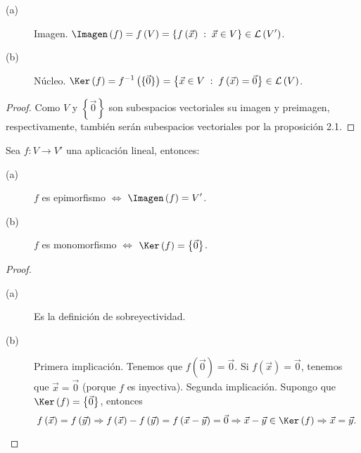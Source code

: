 \begin{fcolorary}[]
\normalfont 
\begin{description}
	\item[(a)] Imagen. $\displaystyle \Imagen\left(f\right) = f\left(V\right) = \left\{ f\left(\vec{x}\right)\; :\; \vec{x} \in V\right\}\in \mathcal{L}\left(V'\right)  $.
		\item[(b)] Núcleo. $\displaystyle \Ker\left(f\right) = f^{-1}\left(\{\vec{0}\}\right) = \left\{ \vec{x}\in V\; : \; f\left(\vec{x}\right) = \vec{0}\right\} \in \mathcal{L}\left(V\right) $.
\end{description}
\end{fcolorary}
\begin{proof}
	Como $\displaystyle V $ y $\displaystyle \left\{ \vec{0}\right\}  $ son subespacios vectoriales su imagen y preimagen, respectivamente, también serán subespacios vectoriales por la proposición 2.1. 
\end{proof}


\begin{fprop}[]
\normalfont Sea $\displaystyle f: V \to V' $ una aplicación lineal, entonces:
\begin{description}
\item[(a)] $\displaystyle f $ es epimorfismo $\displaystyle \iff  $ $\displaystyle \Imagen\left(f\right) = V' $.
\item[(b)] $\displaystyle f $ es monomorfismo $\displaystyle \iff  $ $\displaystyle \Ker\left(f\right) = \left\{ \vec{0}\right\}  $.
\end{description}
\end{fprop}

\begin{proof}
\begin{description}
\item[(a)] Es la definición de sobreyectividad.
	\item[(b)] Primera implicación. Tenemos que $\displaystyle f\left(\vec{0}\right) = \vec{0} $. Si $\displaystyle f\left(\vec{x}\right)=\vec{0} $, tenemos que $\displaystyle \vec{x} = \vec{0} $ (porque $\displaystyle f $ es inyectiva). Segunda implicación. Supongo que $\displaystyle \Ker\left(f\right) = \left\{ \vec{0}\right\}  $, entonces
		\[f\left(\vec{x}\right) = f\left(\vec{y}\right) \Rightarrow f\left(\vec{x}\right)-f\left(\vec{y}\right) = f\left(\vec{x}-\vec{y}\right)= \vec{0} \Rightarrow \vec{x}-\vec{y} \in \Ker\left(f\right) \Rightarrow \vec{x}=\vec{y} .\]
\end{description}
\end{proof}

